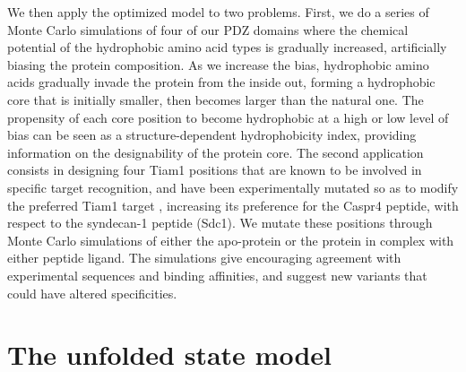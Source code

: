 \documentclass[12pt]{article}
\begin{document}
We then apply the optimized model to two problems. First, we do a series of Monte Carlo simulations of four of our PDZ domains
where the chemical potential of the hydrophobic amino acid types is gradually increased, artificially biasing the protein
composition. As we increase the bias, hydrophobic amino acids gradually invade the protein from the inside out, forming a
hydrophobic core that is initially smaller, then becomes larger than the natural one. The propensity of each core position
to become hydrophobic at a high or low level of bias can be seen as a structure-dependent hydrophobicity index, providing
information on the designability of the protein core. The second application consists in designing four Tiam1 positions that
are known to be involved in specific target recognition, and have been experimentally mutated so as to modify the preferred
Tiam1 target \cite{Sheperd11}, increasing its preference for the Caspr4 peptide, with respect to the syndecan-1 peptide (Sdc1).
We mutate these positions through Monte Carlo simulations of either the apo-protein or the protein in complex with either peptide
ligand. The simulations give encouraging agreement with experimental sequences and binding affinities, and suggest new variants
that could have altered specificities. 

\section{The unfolded state model}
\end{document}

